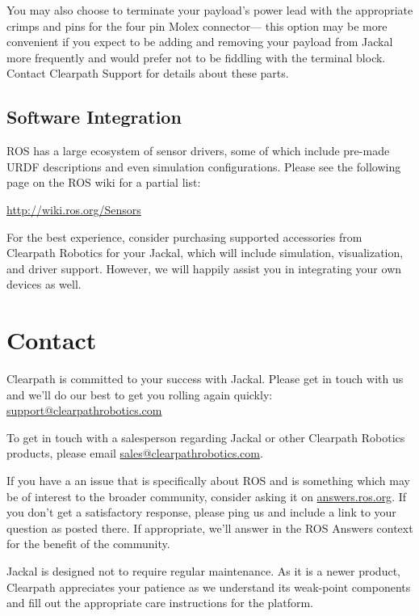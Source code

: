 \documentclass[]{clearpath-latex/clearpath-manual}
\begin{document}
You may also choose to terminate your payload's power lead with the appropriate crimps and pins
for the four pin Molex connector--- this option may be more convenient if you expect to be adding
and removing your payload from Jackal more frequently and would prefer not to be fiddling with the
terminal block. Contact Clearpath Support for details about these parts.


\subsection{Software Integration}

ROS has a large ecosystem of sensor drivers, some of which include pre-made URDF descriptions and
even simulation configurations. Please see the following page on the ROS wiki for a partial list:

\url{http://wiki.ros.org/Sensors}

For the best experience, consider purchasing supported accessories from Clearpath Robotics for your
Jackal, which will include simulation, visualization, and driver support. However, we will happily
assist you in integrating your own devices as well.


\section{Contact}\label{trouble}\label{contact}

Clearpath is committed to your success with Jackal. Please get in touch with us and we'll
do our best to get you rolling again quickly: \href{mailto:support@clearpathrobotics.com}{support@clearpathrobotics.com}

To get in touch with a salesperson regarding Jackal or other Clearpath Robotics products, please
email \href{mailto:sales@clearpathrobotics.com}{sales@clearpathrobotics.com}.

If you have a an issue that is specifically about ROS and is something which may be of interest
to the broader community, consider asking it on \href{http://answers.ros.org}{answers.ros.org}.
If you don't get a satisfactory response, please ping us and include a link to your question
as posted there. If appropriate, we'll answer in the ROS Answers context for the benefit of the
community.

Jackal is designed not to require regular maintenance. As it is a newer product, Clearpath
appreciates your patience as we understand its weak-point components and fill out the appropriate
care instructions for the platform.
\end{document}
